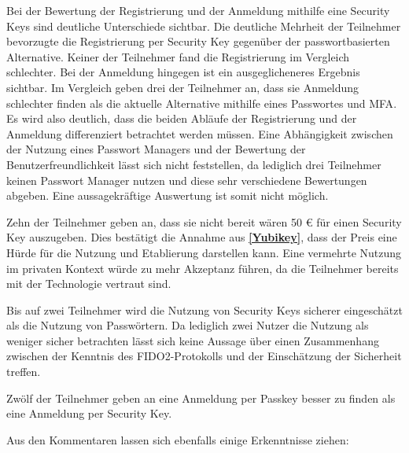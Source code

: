 Bei der Bewertung der Registrierung und der Anmeldung mithilfe eine Security Keys sind deutliche Unterschiede sichtbar. Die deutliche Mehrheit der Teilnehmer bevorzugte die Registrierung per Security Key gegenüber der passwortbasierten Alternative. Keiner der Teilnehmer fand die Registrierung im Vergleich schlechter. Bei der Anmeldung hingegen ist ein ausgeglicheneres Ergebnis sichtbar. Im Vergleich geben drei der Teilnehmer an, dass sie Anmeldung schlechter finden als die aktuelle Alternative mithilfe eines Passwortes und \ac{MFA}. Es wird also deutlich, dass die beiden Abläufe der Registrierung und der Anmeldung differenziert betrachtet werden müssen. 
Eine Abhängigkeit zwischen der Nutzung eines Passwort Managers und der Bewertung der Benutzerfreundlichkeit lässt sich nicht feststellen, da lediglich drei Teilnehmer keinen Passwort Manager nutzen und diese sehr verschiedene Bewertungen abgeben. Eine aussagekräftige Auswertung ist somit nicht möglich. 


Zehn der Teilnehmer geben an, dass sie nicht bereit wären 50 € für einen Security Key auszugeben. Dies bestätigt die Annahme aus \textbf{\ref{Yubikey}}, dass der Preis eine Hürde für die Nutzung und Etablierung darstellen kann. Eine vermehrte Nutzung im privaten Kontext würde zu mehr Akzeptanz führen, da die Teilnehmer bereits mit der Technologie vertraut sind. 

Bis auf zwei Teilnehmer wird die Nutzung von Security Keys sicherer eingeschätzt als die Nutzung von Passwörtern. Da lediglich zwei Nutzer die Nutzung als weniger sicher betrachten lässt sich keine Aussage über einen Zusammenhang zwischen der Kenntnis des FIDO2-Protokolls und der Einschätzung der Sicherheit treffen.

Zwölf der Teilnehmer geben an eine Anmeldung per Passkey besser zu finden als eine Anmeldung per Security Key. 

Aus den Kommentaren lassen sich ebenfalls einige Erkenntnisse ziehen:


